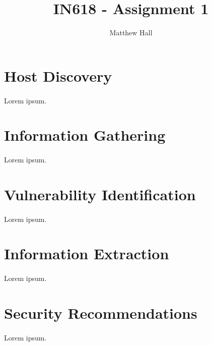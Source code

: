 \documentclass{article}
\title{IN618 - Assignment 1}
\author{Matthew Hall}
\date{}
\begin{document}
\maketitle
\newpage
{}

\tableofcontents
\newpage

\section{Host Discovery}
\paragraph{}
Lorem ipsum.

\newpage

\section{Information Gathering}
\paragraph{}
Lorem ipsum.

\newpage

\section{Vulnerability Identification}
\paragraph{}
Lorem ipsum.

\newpage

\section{Information Extraction}
\paragraph{}
Lorem ipsum.

\newpage

\section{Security Recommendations}
\paragraph{}
Lorem ipsum.
\end{document}
